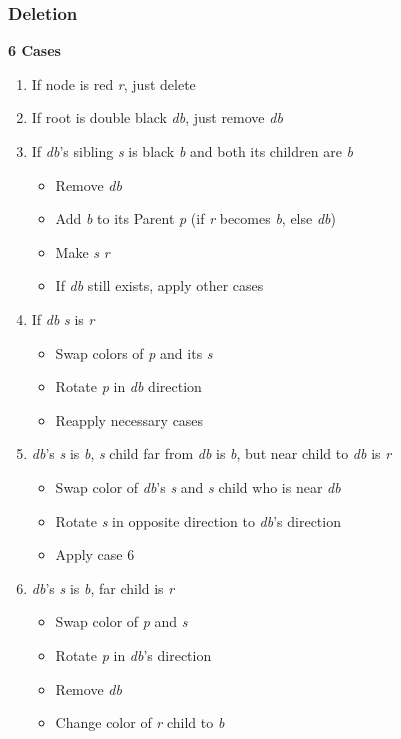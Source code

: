 \documentclass[10pt, 
a4paper, 
oneside, 
headinclude, footinclude, 
BCOR5mm]
{scrartcl}
\begin{document}
\subsubsection{Deletion}
\textbf{6 Cases}
\begin{enumerate}
    \item If node is red \textit{r}, just delete
    \item If root is double black \textit{db}, just remove \textit{db}
    \item If \textit{db}'s sibling \textit{s} is black \textit{b} and both its children are \textit{b}
    \begin{itemize}
        \item Remove \textit{db}
        \item Add \textit{b} to its Parent \textit{p} (if \textit{r} becomes \textit{b}, else \textit{db})
        \item Make \textit{s} \textit{r}
        \item If \textit{db} still exists, apply other cases
    \end{itemize}
    \item If \textit{db} \textit{s} is \textit{r}
    \begin{itemize}
        \item Swap colors of \textit{p} and its \textit{s}
        \item Rotate \textit{p} in \textit{db} direction
        \item Reapply necessary cases
    \end{itemize}
    \item \textit{db}'s \textit{s} is \textit{b}, \textit{s} child far from \textit{db} is \textit{b}, but near child to \textit{db} is \textit{r}
    \begin{itemize}
        \item Swap color of \textit{db}'s \textit{s} and \textit{s} child who is near \textit{db}
        \item Rotate \textit{s} in opposite direction to \textit{db}'s direction
        \item Apply case 6
    \end{itemize} 
    \item \textit{db}'s \textit{s} is \textit{b}, far child is \textit{r}
    \begin{itemize}
        \item Swap color of \textit{p} and \textit{s}
        \item Rotate \textit{p} in \textit{db}'s direction
        \item Remove \textit{db}
        \item Change color of \textit{r} child to \textit{b}
    \end{itemize}
\end{enumerate}
\end{document}
